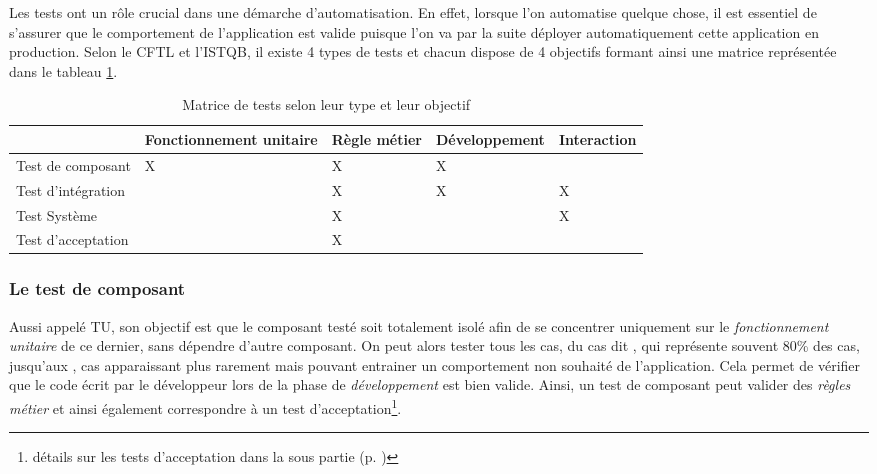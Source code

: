 Les tests ont un rôle crucial dans une démarche d'automatisation. En effet, lorsque l'on automatise quelque chose, il est essentiel de s'assurer que le comportement de l'application est valide puisque l'on va par la suite déployer automatiquement cette application en production. Selon le \gls{CFTL} et l'\gls{ISTQB}, il existe 4 types de tests et chacun dispose de 4 objectifs formant ainsi une matrice représentée dans le tableau \ref{tab:matrice-test}.


\begin{table}[H]
	\centering
	\begin{adjustbox}{width=0.95\textwidth,center=\textwidth} 
		\begin{tabular}{|l|l|l|l|l|}
			\hline
			\diagbox{type de test}{valide} & Fonctionnement unitaire & Règle métier & Développement & Interaction \\ \hline
			Test de composant     & X                       & X            & X              &             \\ \hline
			Test d'intégration    &                         & X            & X              & X           \\ \hline
			Test Système          &                         & X            &               & X           \\ \hline
			Test d'acceptation    &                         & X            &               &             \\ \hline
		\end{tabular}
	\end{adjustbox}
	\caption{Matrice de tests selon leur type et leur objectif}
	\label{tab:matrice-test}
\end{table}

\subsubsection{Le test de composant}\label{test-composant}

Aussi appelé \gls{TU}, son objectif est que le composant testé soit totalement isolé afin de se concentrer uniquement sur le \emph{fonctionnement unitaire} de ce dernier, sans dépendre d'autre composant. On peut alors tester tous les cas, du cas dit , qui représente souvent 80\% des cas, jusqu'aux , cas apparaissant plus rarement mais pouvant entrainer un comportement non souhaité de l'application. Cela permet de vérifier que le code écrit par le développeur lors de la phase de \emph{développement} est bien valide. Ainsi, un test de composant peut valider des \emph{règles métier} et ainsi également correspondre à un test d'acceptation\footnote{détails sur les tests d'acceptation dans la sous partie  (p. \pageref{test-acceptation})}.

